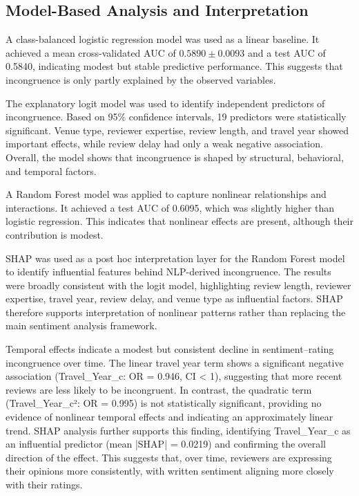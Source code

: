 \documentclass[conference]{IEEEtran}
\begin{document}
\subsection{Model-Based Analysis and Interpretation}
A class-balanced logistic regression model was used as a linear baseline. It
achieved a mean cross-validated AUC of $0.5890 \pm 0.0093$ and a test AUC of
0.5840, indicating modest but stable predictive performance. This suggests that
incongruence is only partly explained by the observed variables.

The explanatory logit model was used to identify independent predictors of
incongruence. Based on 95\% confidence intervals, 19 predictors were
statistically significant. Venue type, reviewer expertise, review length, and
travel year showed important effects, while review delay had only a weak
negative association. Overall, the model shows that incongruence is shaped by
structural, behavioral, and temporal factors.

A Random Forest model was applied to capture nonlinear relationships and
interactions. It achieved a test AUC of 0.6095, which was slightly higher than
logistic regression. This indicates that nonlinear effects are present, although
their contribution is modest.

SHAP was used as a post hoc interpretation layer for the Random Forest model to identify influential features behind NLP-derived incongruence. The results were broadly consistent with the logit model, highlighting review length, reviewer expertise, travel year, review delay, and venue type as influential factors. SHAP therefore supports interpretation of nonlinear patterns rather than replacing the main sentiment analysis framework.

Temporal effects indicate a modest but consistent decline in sentiment–rating incongruence over time. The linear travel year term shows a significant negative association (Travel\_Year\_c: OR = 0.946, CI < 1), suggesting that more recent reviews are less likely to be incongruent. In contrast, the quadratic term (Travel\_Year\_c²: OR = 0.995) is not statistically significant, providing no evidence of nonlinear temporal effects and indicating an approximately linear trend. SHAP analysis further supports this finding, identifying Travel\_Year\_c as an influential predictor (mean |SHAP| = 0.0219) and confirming the overall direction of the effect. This suggests that, over time, reviewers are expressing their opinions more consistently, with written sentiment aligning more closely with their ratings.
\end{document}

